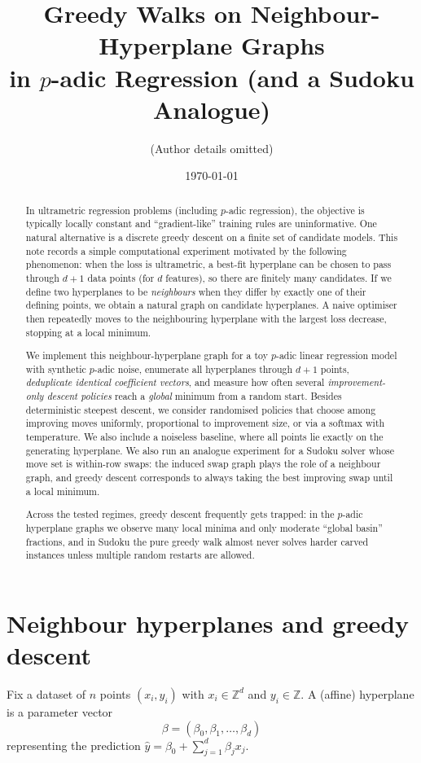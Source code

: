 \documentclass[11pt]{article}
\title{Greedy Walks on Neighbour-Hyperplane Graphs\\in $p$-adic Regression (and a Sudoku Analogue)}
\author{(Author details omitted)}
\date{\today}
\begin{document}
\maketitle

\begin{abstract}
In ultrametric regression problems (including $p$-adic regression), the objective is typically locally constant and ``gradient-like'' training rules are uninformative. One natural alternative is a discrete greedy descent on a finite set of candidate models.
This note records a simple computational experiment motivated by the following phenomenon: when the loss is ultrametric, a best-fit hyperplane can be chosen to pass through $d{+}1$ data points (for $d$ features), so there are finitely many candidates. If we define two hyperplanes to be \emph{neighbours} when they differ by exactly one of their defining points, we obtain a natural graph on candidate hyperplanes. A naive optimiser then repeatedly moves to the neighbouring hyperplane with the largest loss decrease, stopping at a local minimum.

We implement this neighbour-hyperplane graph for a toy $p$-adic linear regression model with synthetic $p$-adic noise, enumerate all hyperplanes through $d{+}1$ points, \emph{deduplicate identical coefficient vectors}, and measure how often several \emph{improvement-only descent policies} reach a \emph{global} minimum from a random start. Besides deterministic steepest descent, we consider randomised policies that choose among improving moves uniformly, proportional to improvement size, or via a softmax with temperature. We also include a noiseless baseline, where all points lie exactly on the generating hyperplane.
We also run an analogue experiment for a Sudoku solver whose move set is within-row swaps: the induced swap graph plays the role of a neighbour graph, and greedy descent corresponds to always taking the best improving swap until a local minimum.

Across the tested regimes, greedy descent frequently gets trapped: in the $p$-adic hyperplane graphs we observe many local minima and only moderate ``global basin'' fractions, and in Sudoku the pure greedy walk almost never solves harder carved instances unless multiple random restarts are allowed.
\end{abstract}

\section{Neighbour hyperplanes and greedy descent}
Fix a dataset of $n$ points $(x_i,y_i)$ with $x_i\in\mathbb{Z}^d$ and $y_i\in\mathbb{Z}$. A (affine) hyperplane is a parameter vector
\[
\beta = (\beta_0,\beta_1,\dots,\beta_d)
\]
representing the prediction $\hat y = \beta_0 + \sum_{j=1}^d \beta_j x_j$.
\end{document}
